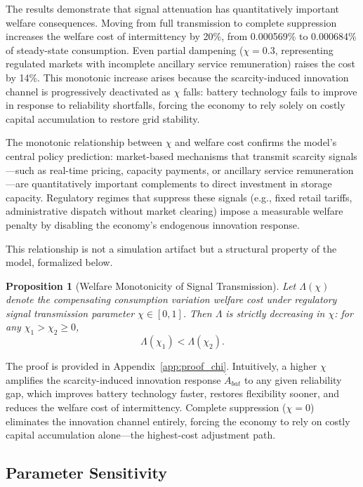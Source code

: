 \documentclass[12pt, a4paper]{article}
\newtheorem{proposition}{Proposition}
\begin{document}
The results demonstrate that signal attenuation has quantitatively important welfare consequences. Moving from full transmission to complete suppression increases the welfare cost of intermittency by 20\%, from 0.000569\% to 0.000684\% of steady-state consumption. Even partial dampening ($\chi = 0.3$, representing regulated markets with incomplete ancillary service remuneration) raises the cost by 14\%. This monotonic increase arises because the scarcity-induced innovation channel is progressively deactivated as $\chi$ falls: battery technology fails to improve in response to reliability shortfalls, forcing the economy to rely solely on costly capital accumulation to restore grid stability.

The monotonic relationship between $\chi$ and welfare cost confirms the model's central policy prediction: market-based mechanisms that transmit scarcity signals---such as real-time pricing, capacity payments, or ancillary service remuneration---are quantitatively important complements to direct investment in storage capacity. Regulatory regimes that suppress these signals (e.g., fixed retail tariffs, administrative dispatch without market clearing) impose a measurable welfare penalty by disabling the economy's endogenous innovation response.

This relationship is not a simulation artifact but a structural property of the model, formalized below.

\begin{proposition}[Welfare Monotonicity of Signal Transmission] \label{prop:chi_monotonicity}
Let $\Lambda(\chi)$ denote the compensating consumption variation welfare cost under regulatory signal transmission parameter $\chi \in [0,1]$. Then $\Lambda$ is strictly decreasing in $\chi$: for any $\chi_1 > \chi_2 \geq 0$,
\[
\Lambda(\chi_1) < \Lambda(\chi_2).
\]
\end{proposition}

\noindent The proof is provided in Appendix~\ref{app:proof_chi}. Intuitively, a higher $\chi$ amplifies the scarcity-induced innovation response $\dot{A}_{bat}$ to any given reliability gap, which improves battery technology faster, restores flexibility sooner, and reduces the welfare cost of intermittency. Complete suppression ($\chi = 0$) eliminates the innovation channel entirely, forcing the economy to rely on costly capital accumulation alone---the highest-cost adjustment path.

\subsection{Parameter Sensitivity}
\end{document}
